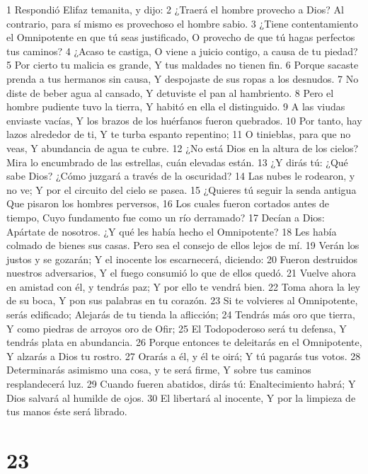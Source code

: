 1 Respondió Elifaz temanita, y dijo:  
2 ¿Traerá el hombre provecho a Dios?  
Al contrario, para sí mismo es provechoso el hombre sabio.  
3 ¿Tiene contentamiento el Omnipotente en que tú seas justificado,  
O provecho de que tú hagas perfectos tus caminos? 
4 ¿Acaso te castiga,  
O viene a juicio contigo, a causa de tu piedad?  
5 Por cierto tu malicia es grande,  
Y tus maldades no tienen fin.  
6 Porque sacaste prenda a tus hermanos sin causa,  
Y despojaste de sus ropas a los desnudos.  
7 No diste de beber agua al cansado,  
Y detuviste el pan al hambriento.  
8 Pero el hombre pudiente tuvo la tierra,  
Y habitó en ella el distinguido.  
9 A las viudas enviaste vacías,  
Y los brazos de los huérfanos fueron quebrados.  
10 Por tanto, hay lazos alrededor de ti,  
Y te turba espanto repentino;  
11 O tinieblas, para que no veas,  
Y abundancia de agua te cubre.  
12 ¿No está Dios en la altura de los cielos?  
Mira lo encumbrado de las estrellas, cuán elevadas están.  
13 ¿Y dirás tú: ¿Qué sabe Dios?  
¿Cómo juzgará a través de la oscuridad?  
14 Las nubes le rodearon, y no ve;  
Y por el circuito del cielo se pasea.  
15 ¿Quieres tú seguir la senda antigua  
Que pisaron los hombres perversos,  
16 Los cuales fueron cortados antes de tiempo,  
Cuyo fundamento fue como un río derramado?  
17 Decían a Dios: Apártate de nosotros.  
¿Y qué les había hecho el Omnipotente?  
18 Les había colmado de bienes sus casas.  
Pero sea el consejo de ellos lejos de mí.  
19 Verán los justos y se gozarán;  
Y el inocente los escarnecerá, diciendo:  
20 Fueron destruidos nuestros adversarios,  
Y el fuego consumió lo que de ellos quedó.  
21 Vuelve ahora en amistad con él, y tendrás paz;  
Y por ello te vendrá bien.  
22 Toma ahora la ley de su boca,  
Y pon sus palabras en tu corazón.  
23 Si te volvieres al Omnipotente, serás edificado;  
Alejarás de tu tienda la aflicción;  
24 Tendrás más oro que tierra,  
Y como piedras de arroyos oro de Ofir;  
25 El Todopoderoso será tu defensa,  
Y tendrás plata en abundancia.  
26 Porque entonces te deleitarás en el Omnipotente,  
Y alzarás a Dios tu rostro.  
27 Orarás a él, y él te oirá;  
Y tú pagarás tus votos.  
28 Determinarás asimismo una cosa, y te será firme,  
Y sobre tus caminos resplandecerá luz.  
29 Cuando fueren abatidos, dirás tú: Enaltecimiento habrá;  
Y Dios salvará al humilde de ojos.  
30 El libertará al inocente,  
Y por la limpieza de tus manos éste será librado.  

\chapter{23}

